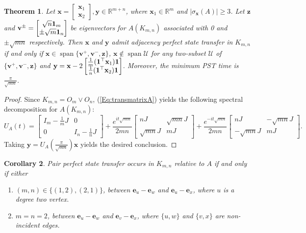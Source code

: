 \documentclass[11pt]{article}
\newtheorem{theorem}{Theorem}
\newtheorem{corollary}[theorem]{Corollary}
\newcommand{\ones}{{\bf{1}}}
\newcommand{\be}{\mathbf e}
\newcommand{\bv}{\mathbf v}
\newcommand{\bx}{\mathbf x}
\newcommand{\by}{\mathbf y}
\newcommand{\bz}{\mathbf z}
\def\R{\mathbb{R}}
\begin{document}
\begin{theorem}
\label{Thm:kmnpst}
Let $\bx=\begin{bmatrix}
\bx_1 \\ \bx_2
\end{bmatrix},\by\in\R^{m+n}$, where $\bx_1\in\R^m$ and $|\sigma_{\bx}(A)|\geq 3$. Let $\bz$ and $\bv^{\pm}=\begin{bmatrix}\sqrt{n}\ones_m \\ \pm \sqrt{m}\ones_n\end{bmatrix}$ be eigenvectors for $A(K_{m,n})$ associated with 0 and $\pm \sqrt{mn}$ respectively. Then $\bx$ and $\by$ admit adjacency perfect state transfer in $K_{m,n}$ if and only if $\bx\in\operatorname{span}\{\bv^+,\bv^-,\bz\}$, $\bx\notin\operatorname{span}\mathcal{U}$ for any two-subset $\mathcal{U}$ of $\{\bv^+,\bv^-,\bz\}$ and $\by=\bx-2\begin{bmatrix}
\frac{1}{m}(\ones^{\top}\bx_1)\ones \\ \frac{1}{n}(\ones^{\top}\bx_2)\ones
\end{bmatrix}$. Moreover, the minimum PST time is $\frac{\pi}{\sqrt{mn}}$.

\end{theorem}

\begin{proof}
Since $K_{m,n}=O_m\vee O_n$,
(\ref{Eq:transmatrixA}) yields the following spectral decomposition for $A(K_{m,n})$:
\begin{equation}
\label{Eq:completebip}
U_A(t)=\begin{bmatrix}
I_m-\frac{1}{m}J&0 \\ 0&I_n-\frac{1}{n}J
\end{bmatrix}+\frac{e^{it\sqrt{mn}}}{2mn}\begin{bmatrix}
nJ&\sqrt{mn}J \\ \sqrt{mn}J&mJ
\end{bmatrix}+\frac{e^{-it\sqrt{mn}}}{2mn}\begin{bmatrix}
nJ&-\sqrt{mn}J \\ -\sqrt{mn}J&mJ
\end{bmatrix}.
\end{equation}
Taking $\by=U_A(\frac{\pi}{\sqrt{mn}})\bx$ yields the desired conclusion.
\end{proof}

\begin{corollary}
\label{Cor:pairpstkn}
Pair perfect state transfer occurs in $K_{m,n}$ relative to $A$ if and only if either
\begin{enumerate}
\item $(m,n)\in\{(1,2),(2,1)\}$, between $\be_u-\be_w$ and $\be_u-\be_x$, where $u$ is a degree two vertex.
\item $m=n=2$, between $\be_u-\be_w$ and $\be_v-\be_x$, where $\{u,w\}$ and $\{v,x\}$ are non-incident edges.  
\end{enumerate} 
\end{corollary}
\end{document}
